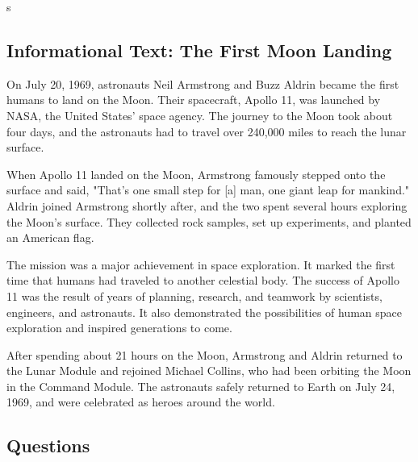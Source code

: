 s\documentclass[12pt]{article}
\begin{document}
\onehalfspacing


\subsection*{Informational Text: The First Moon Landing}

\begin{tcolorbox}[colframe=black!40, colback=gray!5]

\begin{spacing}{1.15}
    On July 20, 1969, astronauts Neil Armstrong and Buzz Aldrin became the first humans to land on the Moon. Their spacecraft, Apollo 11, was launched by NASA, the United States' space agency. The journey to the Moon took about four days, and the astronauts had to travel over 240,000 miles to reach the lunar surface.

    When Apollo 11 landed on the Moon, Armstrong famously stepped onto the surface and said, "That's one small step for [a] man, one giant leap for mankind." Aldrin joined Armstrong shortly after, and the two spent several hours exploring the Moon's surface. They collected rock samples, set up experiments, and planted an American flag.

    The mission was a major achievement in space exploration. It marked the first time that humans had traveled to another celestial body. The success of Apollo 11 was the result of years of planning, research, and teamwork by scientists, engineers, and astronauts. It also demonstrated the possibilities of human space exploration and inspired generations to come.

    After spending about 21 hours on the Moon, Armstrong and Aldrin returned to the Lunar Module and rejoined Michael Collins, who had been orbiting the Moon in the Command Module. The astronauts safely returned to Earth on July 24, 1969, and were celebrated as heroes around the world.

\end{spacing}

\end{tcolorbox}

\vspace{1cm}


\subsection*{Questions}
\end{document}
